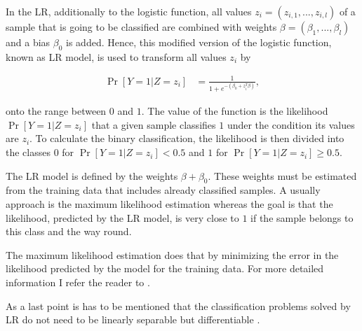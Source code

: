 In the \ac{LR}, additionally to the logistic function, all values $z_i = (z_{i,1}, ...,z_{i,l})$ of a sample that is going to be classified are combined with weights $\beta =(\beta_1, ..., \beta_l)$ and a bias $\beta_0$ is added. %
Hence, this modified version of the logistic function, known as \ac{LR} model, is used to transform all values $z_i$ by 

\begin{align*}
\Pr[Y = 1 | Z = z_i] &= \frac{1}{1 + e^{-(\beta_0 + z^T_i \beta)}},
\end{align*}

onto the range between $0$ and $1$.
The value of the function is the likelihood $\Pr[Y = 1 | Z = z_i]$ that a given sample classifies $1$ under the condition its values are $z_i$.
To calculate the binary classification, the likelihood is then divided into the classes $0$ for $\Pr[Y = 1 | Z = z_i] < 0.5$ and $1$ for $\Pr[Y = 1 | Z = z_i] \ge 0.5$. %

The \ac{LR} model is defined by the weights $\beta + \beta_0$. %
These weights must be estimated from the training data that includes already classified samples.
A usually approach is the maximum likelihood estimation whereas the goal is that the likelihood, predicted by the \ac{LR} model, is very close to $1$ if the sample belongs to this class and the way round. %

The maximum likelihood estimation does that by minimizing the error in the likelihood predicted by the model for the training data. %
For more detailed information I refer the reader to \cite{Wikipedia2017MaximumEstimation}.

As a last point is has to be mentioned that the classification problems solved by \ac{LR} do not need to be linearly separable but differentiable \cite{Ruhrmair2010ModelingFunctions}.


